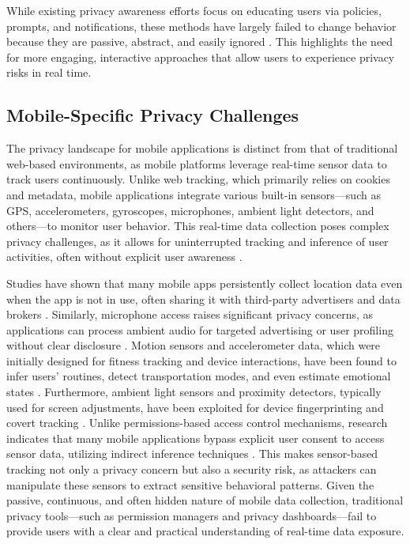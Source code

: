 \documentclass[acmlarge, nonacm]{acmart}
\begin{document}
While existing privacy awareness efforts focus on educating users via policies, prompts, and notifications, these methods have largely failed to change behavior because they are passive, abstract, and easily ignored \cite{feng2021yaodesign}. This highlights the need for more engaging, interactive approaches that allow users to experience privacy risks in real time.

\subsection{Mobile-Specific Privacy Challenges}
The privacy landscape for mobile applications is distinct from that of traditional web-based environments, as mobile platforms leverage real-time sensor data to track users continuously. Unlike web tracking, which primarily relies on cookies and metadata, mobile applications integrate various built-in sensors—such as GPS, accelerometers, gyroscopes, microphones, ambient light detectors, and others—to monitor user behavior. This real-time data collection poses complex privacy challenges, as it allows for uninterrupted tracking and inference of user activities, often without explicit user awareness \cite{CAHAR}.

Studies have shown that many mobile apps persistently collect location data even when the app is not in use, often sharing it with third-party advertisers and data brokers \cite{bian2021supply}. Similarly, microphone access raises significant privacy concerns, as applications can process ambient audio for targeted advertising or user profiling without clear disclosure \cite{pudasaini2024comprehensive}. Motion sensors and accelerometer data, which were initially designed for fitness tracking and device interactions, have been found to infer users’ routines, detect transportation modes, and even estimate emotional states \cite{niemeijer2023promise}. Furthermore, ambient light sensors and proximity detectors, typically used for screen adjustments, have been exploited for device fingerprinting and covert tracking \cite{berdich2023survey}. Unlike permissions-based access control mechanisms, research indicates that many mobile applications bypass explicit user consent to access sensor data, utilizing indirect inference techniques \cite{aburas2024user}. This makes sensor-based tracking not only a privacy concern but also a security risk, as attackers can manipulate these sensors to extract sensitive behavioral patterns. Given the passive, continuous, and often hidden nature of mobile data collection, traditional privacy tools—such as permission managers and privacy dashboards—fail to provide users with a clear and practical understanding of real-time data exposure.
\end{document}
